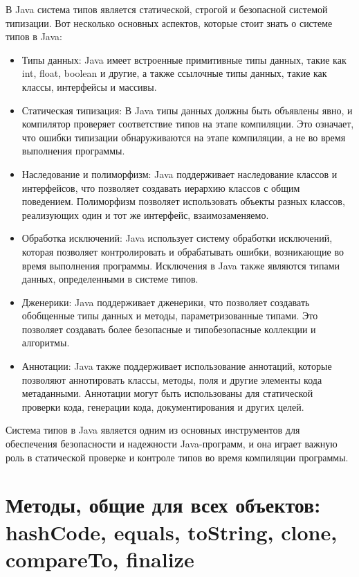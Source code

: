 В Java система типов является статической, строгой и безопасной системой типизации. Вот несколько основных аспектов, которые стоит знать о системе типов в Java:
\begin{itemize}
    \item Типы данных: Java имеет встроенные примитивные типы данных, такие как int, float, boolean и другие, а также ссылочные типы данных, такие как классы, интерфейсы и массивы.

    \item Статическая типизация: В Java типы данных должны быть объявлены явно, и компилятор проверяет соответствие типов на этапе компиляции. Это означает, что ошибки типизации обнаруживаются на этапе компиляции, а не во время выполнения программы.

    \item Наследование и полиморфизм: Java поддерживает наследование классов и интерфейсов, что позволяет создавать иерархию классов с общим поведением. Полиморфизм позволяет использовать объекты разных классов, реализующих один и тот же интерфейс, взаимозаменяемо.

    \item Обработка исключений: Java использует систему обработки исключений, которая позволяет контролировать и обрабатывать ошибки, возникающие во время выполнения программы. Исключения в Java также являются типами данных, определенными в системе типов.

    \item Дженерики: Java поддерживает дженерики, что позволяет создавать обобщенные типы данных и методы, параметризованные типами. Это позволяет создавать более безопасные и типобезопасные коллекции и алгоритмы.

    \item Аннотации: Java также поддерживает использование аннотаций, которые позволяют аннотировать классы, методы, поля и другие элементы кода метаданными. Аннотации могут быть использованы для статической проверки кода, генерации кода, документирования и других целей.
\end{itemize}
Система типов в Java является одним из основных инструментов для обеспечения безопасности и надежности Java-программ, и она играет важную роль в статической проверке и контроле типов во время компиляции программы.
\section{Методы, общие для всех объектов: hashCode, equals, toString, clone, compareTo, finalize}
